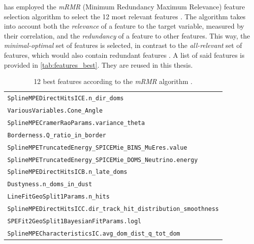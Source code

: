 \citeauthor{dsea_jan} has employed the \emph{mRMR} (Minimum Redundancy Maximum Relevance) feature selection algorithm \cite{mrmr}
to select the 12 most relevant features \cite{dsea_jan}.
The algorithm takes into account both
  the \emph{relevance} of a feature to the target variable,
    measured by their correlation,
  and the \emph{redundancy} of a feature to other features.
This way,
the \emph{minimal-optimal} set of features is selected,
  in contrast to the \emph{all-relevant} set of features,
    which would also contain redundant features \citationneeded{}. %
A list of said features is provided in \autoref{tab:features_best}.
They are reused in this thesis.

\begin{table}
    \centering
    \caption{
      12 best features according to the \emph{mRMR} algorithm \cite{dsea_jan}.
    }
    \label{tab:features_best}
    \begin{tabular}{l}
        \toprule
        \texttt{SplineMPEDirectHitsICE.n\_dir\_doms} \\
        \texttt{VariousVariables.Cone\_Angle} \\
        \texttt{SplineMPECramerRaoParams.variance\_theta} \\
        \texttt{Borderness.Q\_ratio\_in\_border} \\
        \texttt{SplineMPETruncatedEnergy\_SPICEMie\_BINS\_MuEres.value} \\
        \texttt{SplineMPETruncatedEnergy\_SPICEMie\_DOMS\_Neutrino.energy} \\
        \texttt{SplineMPEDirectHitsICB.n\_late\_doms} \\
        \texttt{Dustyness.n\_doms\_in\_dust} \\
        \texttt{LineFitGeoSplit1Params.n\_hits} \\
        \texttt{SplineMPEDirectHitsICC.dir\_track\_hit\_distribution\_smoothness} \\
        \texttt{SPEFit2GeoSplit1BayesianFitParams.logl} \\
        \texttt{SplineMPECharacteristicsIC.avg\_dom\_dist\_q\_tot\_dom} \\
        \bottomrule
    \end{tabular}
\end{table}


